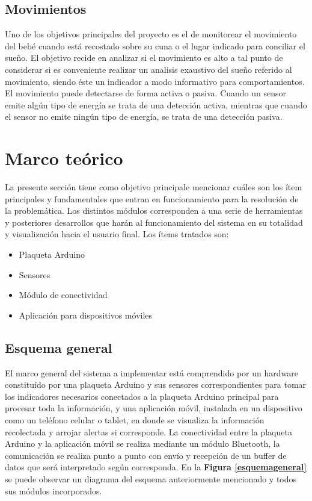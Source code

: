 \documentclass{IEEEtran}
\begin{document}
		\subsection{Movimientos}

		Uno de los objetivos principales del proyecto es el de monitorear el movimiento del bebé cuando está recostado sobre su cuna o el lugar indicado para conciliar el sueño. El objetivo recide en analizar si el movimiento es alto a tal punto de considerar si es conveniente realizar un analisis exaustivo del sueño referido al movimiento, siendo éste un indicador a modo informativo para comportamientos. El movimiento puede detectarse de forma activa o pasiva. Cuando un sensor emite algún tipo de energía se trata de una detección activa, mientras que cuando el sensor no emite ningún tipo de energía, se trata de una detección pasiva.

	\section{Marco teórico}

		La presente sección tiene como objetivo principale mencionar cuáles son los ítem principales y fundamentales que entran en funcionamiento para la resolución de la problemática. Los distintos módulos corresponden a una serie de herramientas y posteriores desarrollos que harán al funcionamiento del sistema en su totalidad y visualización hacia el usuario final. Los ítems tratados son:

		\begin{itemize}
			\item Plaqueta Arduino
			\item Sensores
			\item Módulo de conectividad
			\item Aplicación para dispositivos móviles
		\end{itemize}

		\subsection{Esquema general}

			El marco general del sistema a implementar está comprendido por un hardware constituído por una plaqueta Arduino y sus sensores correspondientes para tomar los indicadores necesarios conectados a la plaqueta Arduino principal para procesar toda la información, y una aplicación móvil, instalada en un dispositivo como un teléfono celular o tablet, en donde se visualiza la información recolectada y arrojar alertas si corresponde. La conectividad entre la plaqueta Arduino y la aplicación móvil se realiza mediante un módulo Bluetooth, la comunicación se realiza punto a punto con envío y recepción de un buffer de datos que será interpretado según corresponda. En la \textbf{Figura \ref{esquemageneral}} se puede observar un diagrama del esquema anteriormente mencionado y todos sus módulos incorporados.
\end{document}
